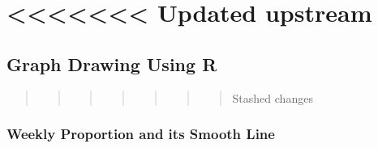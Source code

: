 \documentclass[
]{article}
\begin{document}
\section{\textless\textless\textless\textless\textless\textless\textless{}
Updated upstream}\label{updated-upstream}

\subsection{Graph Drawing Using R}\label{graph-drawing-using-r}

\begin{quote}
\begin{quote}
\begin{quote}
\begin{quote}
\begin{quote}
\begin{quote}
\begin{quote}
Stashed changes
\end{quote}
\end{quote}
\end{quote}
\end{quote}
\end{quote}
\end{quote}
\end{quote}

\subsubsection{Weekly Proportion and its Smooth
Line}\label{weekly-proportion-and-its-smooth-line}
\end{document}
